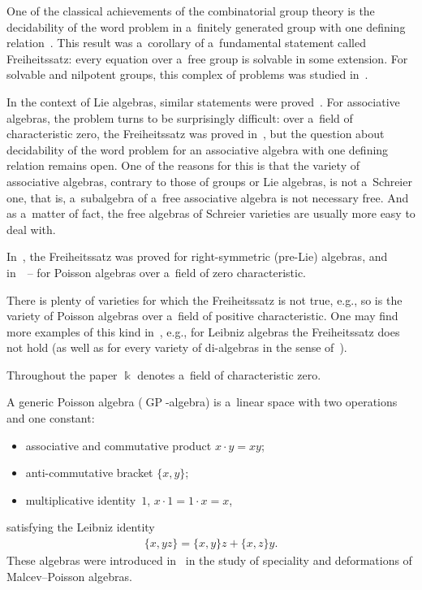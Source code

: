 \documentclass[pdftex]{sigma}
\begin{document}
One of the classical achievements of the combinatorial group theory is the decidability of the word problem in
a~f\/initely generated group with one def\/ining relation~\cite{Magnus}.
This result was a~corollary of a~fundamental statement called Freiheitssatz: every equation over a~free group is
solvable in some extension.
For solvable and nilpotent groups, this complex of problems was studied in~\cite{Rom72}.

In the context of Lie algebras, similar statements were proved~\cite{Sh62}.
For associative algebras, the problem turns to be surprisingly dif\/f\/icult: over a~f\/ield of characteristic zero, the
Freiheitssatz was proved in~\cite{LML85}, but the question about decidability of the word problem for an associative
algebra with one def\/ining relation remains open.
One of the reasons for this is that the variety of associative algebras, contrary to those of groups or Lie algebras, is
not a~Schreier one, that is, a~subalgebra of a~free associative algebra is not necessary free.
And as a~matter of fact, the free algebras of Schreier varieties are usually more easy to deal with.

In~\cite{KMLU08}, the Freiheitssatz was proved for right-symmetric (pre-Lie) algebras, and in~\cite{MLU10}~-- for
Poisson algebras over a~f\/ield of zero characteristic.

There is plenty of varieties for which the Freiheitssatz is not true, e.g., so is the variety of Poisson algebras over
a~f\/ield of positive characteristic.
One may f\/ind more examples of this kind in~\cite{MikSh2013}, e.g., for Leibniz algebras the Freiheitssatz does not hold
(as well as for every variety of di-algebras in the sense of~\cite{Kol2008}).

Throughout the paper $\Bbbk $ denotes a~f\/ield of characteristic zero.

A generic Poisson algebra ($\operatorname{GP}$-algebra) is a~linear space with two operations and one constant:
\begin{itemize}\itemsep=0pt
\item associative and commutative product $x\cdot y = xy$;
\item anti-commutative bracket $\{x,y \}$;
\item multiplicative identity~$1$, $x\cdot 1 = 1\cdot x = x$,
\end{itemize}
satisfying the Leibniz identity
\begin{gather*}
\{x,yz\} = \{x,y\}z + \{x,z\}y.
\end{gather*}
These algebras were introduced in~\cite{Shest2000} in the study of speciality and deformations of Malcev--Poisson
algebras.
\end{document}
